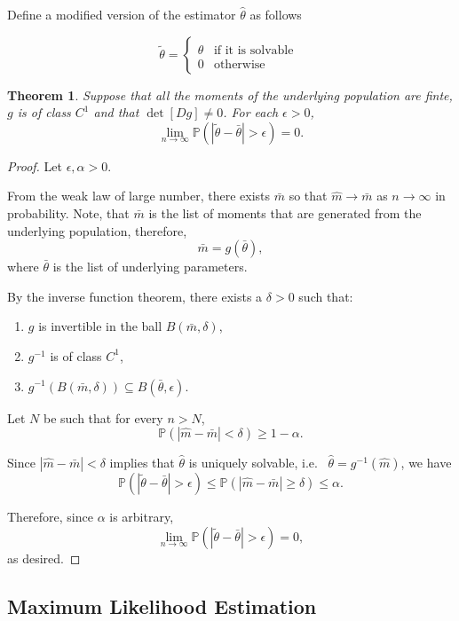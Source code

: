 \documentclass[
  openany]{book}
\newtheorem{theorem}{Theorem}[chapter]
\theoremstyle{definition}
\theoremstyle{definition}
\theoremstyle{definition}
\theoremstyle{definition}
\theoremstyle{remark}
\begin{document}
Define a modified version of the estimator \(\hat \theta\) as follows

\[ \tilde \theta =
\begin{cases} \hat \theta & \text{if it is solvable } \\
   0 & \text{otherwise}\end{cases}\]

\begin{theorem}
Suppose that all the moments of the underlying population are finte,
\(g\) is of class \(C^1\) and that \(\det[Dg]\not= 0\).
For each \(\epsilon >0\),
\[\lim_{n\to \infty}\mathbb{P}( |\tilde \theta - \bar \theta| > \epsilon ) = 0.\]
\end{theorem}

\begin{proof}
Let \(\epsilon, \alpha >0\).

From the weak law of large number, there exists \(\bar m\) so that \(\hat m \to \bar m\)
as \(n \to \infty\) in probability.
Note, that \(\bar m\) is the list of moments that are generated from the underlying
population, therefore,
\[\bar m = g (\bar \theta),\]
where \(\bar\theta\) is the list of underlying parameters.

By the inverse function theorem, there exists a \(\delta >0\) such that:

\begin{enumerate}
\def\labelenumi{\arabic{enumi}.}
\item
  \(g\) is invertible in the ball \(B(\bar m, \delta)\),
\item
  \(g^{-1}\) is of class \(C^1\),
\item
  \(g^{-1}(B(\bar m, \delta)) \subseteq B(\bar \theta, \epsilon)\).
\end{enumerate}

Let \(N\) be such that for every \(n > N\),
\[\mathbb{P}( |\hat m - \bar m| < \delta) \geq 1 - \alpha. \]

Since \(|\hat m - \bar m| < \delta\) implies that \(\hat\theta\) is uniquely solvable, i.e.~
\(\hat\theta = g^{-1}(\hat m)\),
we have
\[ \mathbb{P}(| \tilde \theta - \bar \theta | > \epsilon) \leq \mathbb{P}( |\hat m - \bar m| \geq \delta) \leq \alpha. \]

Therefore, since \(\alpha\) is arbitrary,
\[\lim_{n\to \infty}\mathbb{P}( |\tilde \theta - \bar \theta| > \epsilon ) = 0,\]
as desired.
\end{proof}

\subsection{Maximum Likelihood Estimation}\label{maximum-likelihood-estimation}
\end{document}
